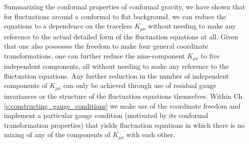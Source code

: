 Summarizing the conformal properties of conformal gravity, we have shown that for fluctuations around a conformal to flat background, we can reduce the equations to a dependence on the traceless $K_{\mu\nu}$ without needing to make any reference to the actual detailed form of the fluctuation equations at all. Given that one also possesses the freedom to make four general coordinate transformations, one can further reduce the nine-component $K_{\mu\nu}$ to five independent components, all without needing to make any reference to the fluctuation equations. Any further reduction in the number of independent components of $K_{\mu\nu}$ can only be achieved through use of residual gauge invariances or the structure of the fluctuation equations themselves. Within Ch. \ref{c:constructing_gauge_conditions} we make use of the coordinate freedom and implement a particular gauge condition (motivated by its conformal transformation properties) that yields fluctuation equations in which there is no mixing of any of the components of $K_{\mu\nu}$ with each other.


